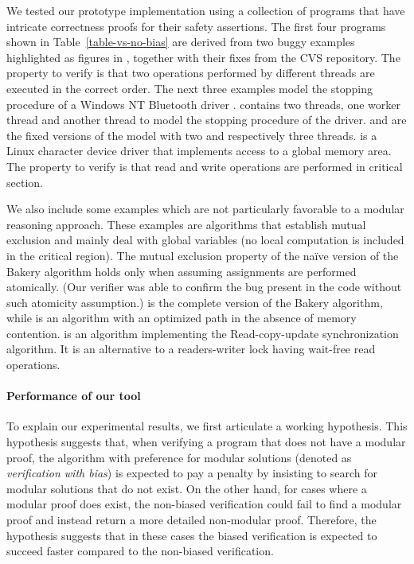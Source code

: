 We tested our prototype implementation using a collection of programs
that have intricate correctness proofs for their safety assertions.
The first four programs shown in Table~\ref{table-vs-no-bias} are
derived from two buggy examples highlighted as figures in
\cite{LuASPLOS08}, together with their fixes from the \Mozilla CVS
repository.
The property to verify is that two operations performed by different
threads are executed in the correct order.
The next three examples model the stopping procedure of a Windows NT
Bluetooth driver \cite{QadeerPLDI04}.
\BluetoothTwo contains two threads, one worker thread and another thread
to model the stopping procedure of the driver.
\BluetoothTwoFixed and \BluetoothThreeFixed are the fixed versions of
the model with two and respectively three threads.
\Scull\cite{CorbetBook05} is a Linux character device driver that
implements access to a global memory area.
The property to verify is that read and write operations are performed
in critical section.

We also include some examples which are not particularly favorable to
a modular reasoning approach.
These examples are algorithms that establish mutual exclusion and mainly
deal with global variables (no local computation is included in the
critical region).
The mutual exclusion property of the na\"ive version of the Bakery
algorithm \cite{MannSafetyBook95} holds only when assuming
assignments are performed atomically. 
(Our verifier was able to confirm the bug present in the code without
such atomicity assumption.)
\Bakery\cite{LamportCACM74} is the complete version of the Bakery
algorithm, while \Lamport\cite{LamportTCS87} is an algorithm with an
optimized path in the absence of memory contention.
\QRCU\cite{McKenneyLWN07} is an algorithm implementing the
Read-copy-update synchronization algorithm.
It is an alternative to a readers-writer lock having wait-free read
operations.


\paragraph{Performance of our tool} 

To explain our experimental results, we first articulate a working
hypothesis.
This hypothesis suggests that, when verifying a program that does not
have a modular proof, the algorithm with preference for modular
solutions (denoted as \emph{verification with bias}) is expected to
pay a penalty by insisting to search for modular solutions that do
not exist.
On the other hand, for cases where a modular proof does exist, the
non-biased verification could fail to find a modular proof and instead
return a more detailed non-modular proof.
Therefore, the hypothesis suggests that in these cases the biased
verification is expected to succeed faster compared to the non-biased
verification.


